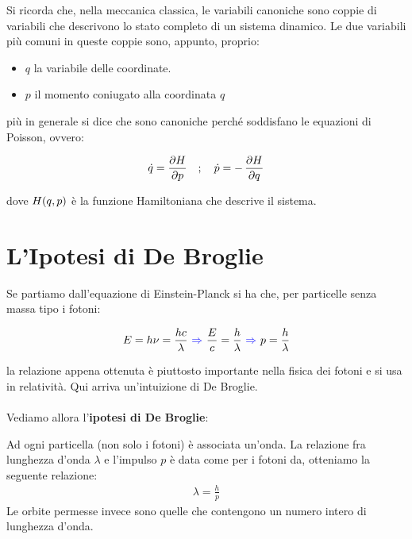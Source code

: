 \begin{enumerate}[label=\arabic*), start = 3]
	\begin{myapprf}

		Si ricorda che, nella meccanica classica, le variabili canoniche sono coppie di variabili che descrivono lo stato completo di un sistema dinamico. Le due variabili più comuni in queste coppie sono, appunto, proprio:
	\begin{itemize}
		\item $q$ la variabile delle coordinate. 
		\item $p$ il momento coniugato alla coordinata $q$
	\end{itemize}

	più in generale si dice che sono canoniche perché soddisfano le equazioni di Poisson, ovvero:
	
	\begin{align*}
		\dot{q} = \pdv{H}{p} \quad ; \quad \dot{p} = - \, \pdv{H}{q}
	\end{align*}

	dove $H\qty(q, p)$ è la funzione Hamiltoniana che descrive il sistema.

	\end{myapprf}

\end{enumerate}

\section{L'Ipotesi di De Broglie}

	Se partiamo dall'equazione di Einstein-Planck si ha che, per particelle senza massa tipo i fotoni:
	
\begin{align*}
	E = h \nu = \frac{hc}{\lambda} \, \,\textcolor{blue}{\Rightarrow} \, \,\frac{E}{c} = \frac{h}{\lambda} \, \,\textcolor{blue}{\Rightarrow} \,\, p = \frac{h}{\lambda}
\end{align*}

	la relazione appena ottenuta è piuttosto importante nella fisica dei fotoni e si usa in relatività. Qui arriva un'intuizione di De Broglie.
	\\
	\\
	Vediamo allora l'\textbf{ipotesi di De Broglie}:
	
\begin{myprop}
	Ad ogni particella (non solo i fotoni) è associata un'onda. La relazione fra lunghezza d'onda $\lambda$ e l'impulso $p$ è data come per i fotoni da, otteniamo la seguente relazione:
\begin{align*}
	\lambda = \frac{h}{p}
\end{align*}
	Le orbite permesse invece sono quelle che contengono un numero intero di lunghezza d'onda.
\end{myprop}

